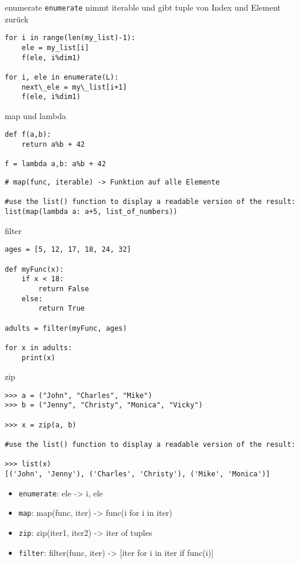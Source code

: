 \begin{frame}[fragile]{enumerate}
\texttt{enumerate} nimmt iterable und gibt tuple von Index und Element zurück
\begin{lstlisting}
for i in range(len(my_list)-1):
	ele = my_list[i]
	f(ele, i%dim1)

for i, ele in enumerate(L):
	next\_ele = my\_list[i+1]
	f(ele, i%dim1)
\end{lstlisting}
\end{frame}

\begin{frame}[fragile]{map und lambda}
\begin{lstlisting}
def f(a,b):
	return a%b + 42
	
f = lambda a,b: a%b + 42
\end{lstlisting}
\pause 
\begin{lstlisting}
# map(func, iterable) -> Funktion auf alle Elemente

#use the list() function to display a readable version of the result:
list(map(lambda a: a+5, list_of_numbers))

\end{lstlisting}
\end{frame}

\begin{frame}[fragile]{filter}
\begin{lstlisting}
ages = [5, 12, 17, 18, 24, 32]

def myFunc(x):
	if x < 18:
		return False
	else:
		return True

adults = filter(myFunc, ages)

for x in adults:
	print(x) 
\end{lstlisting}
\end{frame}

\begin{frame}[fragile]{zip}
\begin{lstlisting}
>>> a = ("John", "Charles", "Mike")
>>> b = ("Jenny", "Christy", "Monica", "Vicky")

>>> x = zip(a, b)

#use the list() function to display a readable version of the result:

>>> list(x)
[('John', 'Jenny'), ('Charles', 'Christy'), ('Mike', 'Monica')]

\end{lstlisting}
\end{frame}

\begin{frame}
	\begin{itemize}
		\item \texttt{enumerate}: ele -> i, ele
		\item \texttt{map}: map(func, iter) -> func(i for i in iter)
		\item \texttt{zip}: zip(iter1, iter2) -> iter of tuples
		\item \texttt{filter}: filter(func, iter) -> [iter for i in iter if func(i)]
	\end{itemize}
\end{frame}

